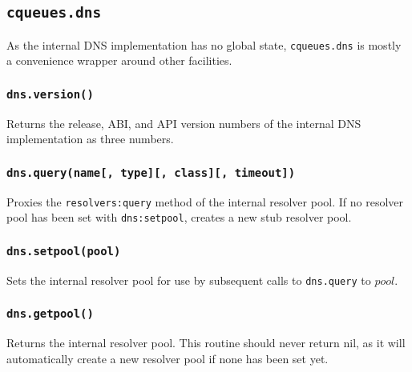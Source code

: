 \documentclass[11pt, oneside]{memoir}
\newcommand*{\fn}[1]{\texttt{#1}\xspace}
\newcommand*{\module}[1]{\texttt{#1}\xspace}
\newcounter{toccols}
\newenvironment{Module}[1]{
	\subsection{\texttt{#1}}
	\addtocontents{toc}{
		\protect\begin{multicols}{\value{toccols}}
	}
}{
	\addtocontents{toc}{\protect\end{multicols}}
}
\begin{document}
\begin{Module}{cqueues.dns}

As the internal DNS implementation has no global state, \module{cqueues.dns} is mostly a convenience wrapper around other facilities.

\subsubsection[\fn{dns.version}]{\fn{dns.version()}}

Returns the release, ABI, and API version numbers of the internal DNS implementation as three numbers.

\subsubsection[\fn{dns.query}]{\fn{dns.query(name[, type][, class][, timeout])}}

Proxies the \fn{resolvers:query} method of the internal resolver pool. If no resolver pool has been set with \fn{dns:setpool}, creates a new stub resolver pool.

\subsubsection[\fn{dns.setpool}]{\fn{dns.setpool(pool)}}

Sets the internal resolver pool for use by subsequent calls to \fn{dns.query} to $pool$.

\subsubsection[\fn{dns.getpool}]{\fn{dns.getpool()}}

Returns the internal resolver pool. This routine should never return nil, as it will automatically
create a new resolver pool if none has been set yet.

\end{Module}
\end{document}
